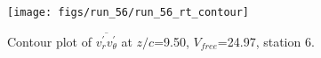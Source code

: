 \begin{figure}[H]
\centering
\texttt{[image: figs/run\_56/run\_56\_rt\_contour]}
\caption{Contour plot of $\overline{v_{r}^{\prime} v_{\theta}^{\prime}}$ at $z/c$=9.50, $V_{free}$=24.97, station 6.}
\label{fig:run_56_rt_contour}
\end{figure}


